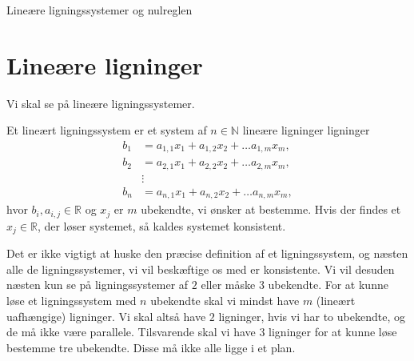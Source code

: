 
\begin{center}
\Huge
Lineære ligningssystemer og nulreglen
\end{center}

\section*{Lineære ligninger}
Vi skal se på lineære ligningssystemer. 
\begin{defn}
Et lineært ligningssystem er et system af $n\in \mathbb{N}$ lineære ligninger ligninger
\begin{align*}
b_1&= a_{1,1}x_1+a_{1,2}x_2+\hdots a_{1,m}x_m, \\
b_2&= a_{2,1}x_1+a_{2,2}x_2+\hdots a_{2,m}x_m,\\
&\vdots\\
b_n&= a_{n,1}x_1+a_{n,2}x_2+\hdots a_{n,m}x_m,
\end{align*}
hvor $b_i,a_{i,j}\in \mathbb{R}$ og $x_j$ er $m$ ubekendte, vi ønsker at bestemme. Hvis der findes et $x_j \in \mathbb{R}$, der løser systemet, så kaldes systemet konsistent.
\end{defn}
Det er ikke vigtigt at huske den præcise definition af et ligningssystem, og næsten alle de ligningssystemer, vi vil beskæftige os med er konsistente. Vi vil desuden næsten kun se på ligningssystemer af $2$ eller måske $3$ ubekendte. For at kunne løse et ligningssystem med $n$ ubekendte skal vi mindst have $m$ (lineært uafhængige) ligninger. Vi skal altså have $2$ ligninger, hvis vi har to ubekendte, og de må ikke være parallele. Tilsvarende skal vi have $3$ ligninger for at kunne løse bestemme tre ubekendte. Disse må ikke alle ligge i et plan.

